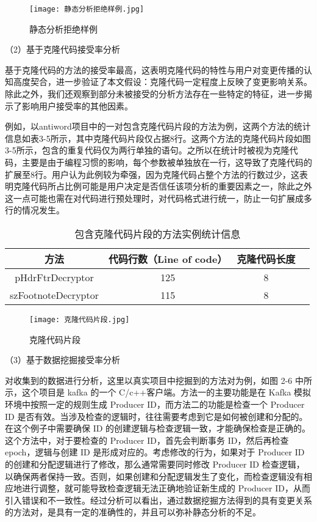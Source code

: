 \begin{figure}[h]
\centering
\texttt{[image: 静态分析拒绝样例.jpg]}
\caption{静态分析拒绝样例}
\end{figure}

（2）基于克隆代码接受率分析

基于克隆代码的方法的接受率最高，这表明克隆代码的特性与用户对变更传播的认知高度契合，进一步验证了本文假设：克隆代码一定程度上反映了变更影响关系。除此之外，我们还观察到部分未被接受的分析方法存在一些特定的特征，进一步揭示了影响用户接受率的其他因素。

例如，以antiword项目中的一对包含克隆代码片段的方法为例，这两个方法的统计信息如表3-5所示，其中克隆代码片段仅占据8行。这两个方法的克隆代码片段如图3-5所示，包含的重复代码仅为两行单独的语句。之所以在统计时被视为克隆代码，主要是由于编程习惯的影响，每个参数被单独放在一行，这导致了克隆代码的扩展至8行。用户认为此例较为牵强，因为克隆代码占整个方法的行数过少，这表明克隆代码所占比例可能是用户决定是否信任该项分析的重要因素之一，除此之外这一点可能也需在对代码进行预处理时，对代码格式进行统一，防止一句扩展成多行的情况发生。

\begin{table}[htbp]
\caption{包含克隆代码片段的方法实例统计信息}
\vspace{0.5em}\centering\wuhao
\begin{tabular}{cccc}
\toprule
方法 & 代码行数（Line of code）  & 克隆代码长度\\
\midrule
pHdrFtrDecryptor & 125 & 8 \\
szFootnoteDecryptor  & 115 & 8 \\
\bottomrule
\end{tabular}
\end{table}

\begin{figure}[h]
\centering
\texttt{[image: 克隆代码片段.jpg]}
\caption{克隆代码片段}
\end{figure}




（3）基于数据挖掘接受率分析

对收集到的数据进行分析，这里以真实项目中挖掘到的方法对为例，如图 2-6 中所
示，这个项目是 kafka 的一个 C/c++客户端。方法一的主要功能是在 Kafka 模拟环境中按照一定的规则生成 Producer ID，而方法二的功能是检查一个 Producer ID 是否有效。当涉及检查的逻辑时，往往需要考虑到它是如何被创建和分配的。在这个例子中需要确保 ID 的创建逻辑与检查逻辑一致，才能确保检查是正确的。这个方法中，对于要检查的 Producer ID，首先会判断事务 ID，然后再检查 epoch，逻辑与创建 ID 是形成对应的。考虑修改的行为，如果对于 Producer ID 的创建和分配逻辑进行了修改，那么通常需要同时修改 Producer ID 检查逻辑，以确保两者保持一致。否则，如果创建和分配逻辑发生了变化，而检查逻辑没有相应地进行调整，就可能导致检查逻辑无法正确地验证新生成的 Producer ID，从而引入错误和不一致性。经过分析可以看出，通过数据挖掘方法得到的具有变更关系的方法对，是具有一定的准确性的，并且可以弥补静态分析的不足。

